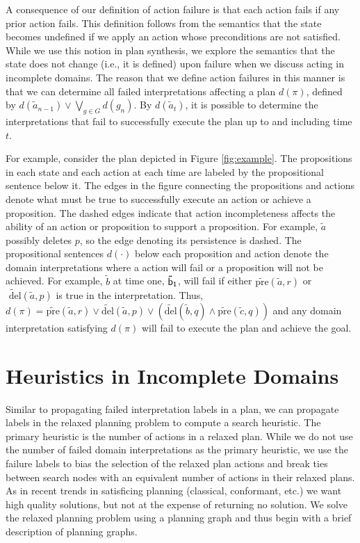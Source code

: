 \documentclass[letterpaper]{article}
\begin{document}
A consequence of our definition of action failure is that each action fails if
any prior action fails.  This definition follows from the semantics that the
state becomes undefined if we apply an action whose preconditions are not
satisfied.  While we use this notion in plan synthesis, we explore the semantics
that the state does not change (i.e., it is defined) upon failure when we
discuss acting in incomplete domains.  The reason that we define action failures
in this manner is that we can determine all failed interpretations affecting a
plan $d(\pi)$, defined  by  $d(\tilde{a}_{n-1}) \vee \bigvee_{g \in G} d(g_n)$.
By  $d(\tilde{a}_t)$, it is possible to determine the interpretations that fail
to successfully execute the plan up to and including time $t$.

For example, consider the plan depicted in Figure \ref{fig:example}.  The
propositions in each state and each action at each time are labeled by the
propositional sentence below it. The edges in the figure connecting the
propositions and actions denote what must be true to successfully execute an
action or achieve a proposition.  The dashed edges indicate that action
incompleteness affects the ability of an action or proposition to support a
proposition.  For example, $\tilde{a}$ possibly deletes $p$, so the edge
denoting its persistence is dashed.  The propositional sentences  $d(\cdot)$
below each proposition and action denote the domain interpretations where a
action will fail or a proposition will not be achieved.  For example,
$\tilde{b}$ at time one, ${\sf \tilde{b}_1}$, will fail if either
$\widetilde{\text{pre}}(\tilde{a}, r)$ or $\widetilde{\text{ del}}(\tilde{a},
p)$ is true in the interpretation.  Thus, $d(\pi) =
\widetilde{\text{pre}}(\tilde{a}, r) \vee \widetilde{\text{del}}(\tilde{a},
p)\vee (\widetilde{\text{del}}(\tilde{b}, q) \wedge
\widetilde{\text{pre}}(\tilde{c}, q))$ and any domain interpretation satisfying
$d(\pi)$ will fail to execute the plan and achieve the goal.




\section{Heuristics in Incomplete Domains}

Similar to propagating failed interpretation labels in a plan, we can propagate
labels in the relaxed planning problem to compute a search heuristic.  The
primary heuristic is the number of actions in a relaxed plan. While we do
not use the number of failed domain interpretations as the primary heuristic, we use the
failure labels to bias the selection of the relaxed plan actions and break ties
between search nodes with an equivalent number of actions in their relaxed
plans.  As in recent trends in satisficing planning (classical, conformant,
etc.) we want high quality solutions, but not at the expense of returning no
solution.  We solve the relaxed planning problem using a planning graph and
thus begin with a brief description of planning graphs. 
\end{document}
